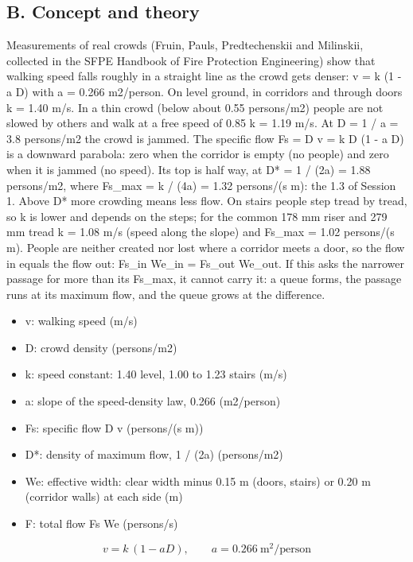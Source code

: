 \documentclass[11pt,a4paper]{article}
\begin{document}
\subsection*{B. Concept and theory}
Measurements of real crowds (Fruin, Pauls, Predtechenskii and Milinskii, collected in the SFPE Handbook of Fire Protection Engineering) show that walking speed falls roughly in a straight line as the crowd gets denser: v = k (1 - a D) with a = 0.266 m2/person. On level ground, in corridors and through doors k = 1.40 m/s. In a thin crowd (below about 0.55 persons/m2) people are not slowed by others and walk at a free speed of 0.85 k = 1.19 m/s. At D = 1 / a = 3.8 persons/m2 the crowd is jammed. The specific flow Fs = D v = k D (1 - a D) is a downward parabola: zero when the corridor is empty (no people) and zero when it is jammed (no speed). Its top is half way, at D* = 1 / (2a) = 1.88 persons/m2, where Fs\_max = k / (4a) = 1.32 persons/(s m): the 1.3 of Session 1. Above D* more crowding means less flow. On stairs people step tread by tread, so k is lower and depends on the steps; for the common 178 mm riser and 279 mm tread k = 1.08 m/s (speed along the slope) and Fs\_max = 1.02 persons/(s m). People are neither created nor lost where a corridor meets a door, so the flow in equals the flow out: Fs\_in We\_in = Fs\_out We\_out. If this asks the narrower passage for more than its Fs\_max, it cannot carry it: a queue forms, the passage runs at its maximum flow, and the queue grows at the difference.

\begin{itemize}[nosep]
\item v: walking speed (m/s)
\item D: crowd density (persons/m2)
\item k: speed constant: 1.40 level, 1.00 to 1.23 stairs (m/s)
\item a: slope of the speed-density law, 0.266 (m2/person)
\item Fs: specific flow D v (persons/(s m))
\item D*: density of maximum flow, 1 / (2a) (persons/m2)
\item We: effective width: clear width minus 0.15 m (doors, stairs) or 0.20 m (corridor walls) at each side (m)
\item F: total flow Fs We (persons/s)
\end{itemize}

\begin{equation*}
v = k\,(1 - a D),\qquad a = 0.266\ \mathrm{m^2/person}
\end{equation*}
\end{document}
